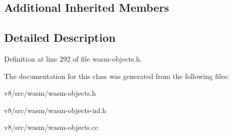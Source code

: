 \subsection*{Additional Inherited Members}


\subsection{Detailed Description}


Definition at line 292 of file wasm-\/objects.\+h.



The documentation for this class was generated from the following files\+:\begin{DoxyCompactItemize}
\item 
v8/src/wasm/wasm-\/objects.\+h\item 
v8/src/wasm/wasm-\/objects-\/inl.\+h\item 
v8/src/wasm/wasm-\/objects.\+cc\end{DoxyCompactItemize}

